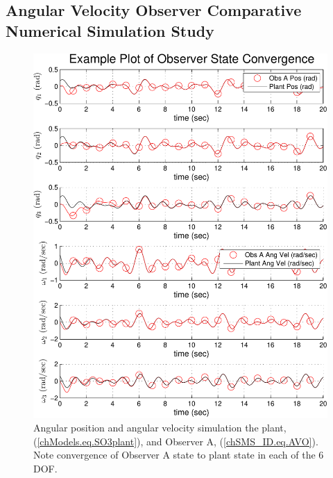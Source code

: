\subsection{Angular Velocity Observer Comparative \\
                Numerical Simulation Study}
\label{chSMS_ID.sec.AVO_sim}

\begin{center}
\begin{figure}[htbp]
  \begin{center}
    \includegraphics[width=150mm]{./chSMS_ID/images/jhuObsStateConv}
  \end{center}
  \caption{ Angular position and angular velocity simulation the
    plant, (\ref{chModels.eq.SO3plant}), and Observer A,
    (\ref{chSMS_ID.eq.AVO}).  Note convergence of Observer A state to
    plant state in each of the 6 \ac{DOF}.}
  \label{chSMS_ID.fig.AVO}
\end{figure}
\end{center}

